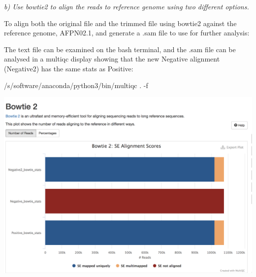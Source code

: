 \documentclass[]{article}
\newenvironment{Shaded}{\begin{snugshade}}{\end{snugshade}}
\newcommand{\VariableTok}[1]{\textcolor[rgb]{0.00,0.00,0.00}{#1}}
\newcommand{\OperatorTok}[1]{\textcolor[rgb]{0.81,0.36,0.00}{\textbf{#1}}}
\newcommand{\BuiltInTok}[1]{#1}
\newcommand{\ExtensionTok}[1]{#1}
\newcommand{\NormalTok}[1]{#1}
\begin{document}
\emph{b) Use bowtie2 to align the reads to reference genome using two
different options.}

To align both the original file and the trimmed file using bowtie2
against the reference genome, AFPN02.1, and generate a .sam file to use
for further analysis:

\begin{Shaded}
\end{Shaded}

\begin{Shaded}
\end{Shaded}

The text file can be examined on the bash terminal, and the .sam file
can be analysed in a multiqc display showing that the new Negative
alignment (Negative2) has the same stats as Positive:

\begin{Shaded}
\begin{Highlighting}[]
\ExtensionTok{/s/software/anaconda/python3/bin/multiqc}\NormalTok{ . -f}
\end{Highlighting}
\end{Shaded}

\includegraphics{Neg_v_Pos_multiq.png}
\end{document}
